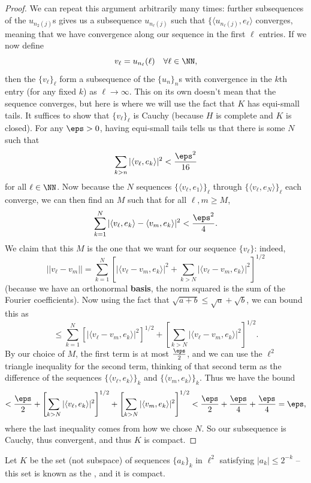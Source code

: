 \begin{proof}
We can repeat this argument arbitrarily many times: further subsequences of the $u_{n_2(j)}$s gives us a subsequence $u_{n_\ell(j)}$ such that $\{\langle u_{n_\ell(j)}, e_\ell \rangle$ converges, meaning that we have convergence along our sequence in the first $\ell$ entries. If we now define
\[
    v_\ell = u_{n_\ell}(\ell) \quad \forall \ell \in \NN,
\]  
then the $\{v_\ell\}_\ell$ form a subsequence of the $\{u_n\}_n$s with convergence in the $k$th entry (for any fixed $k$) as $\ell \to \infty$. This on its own doesn't mean that the sequence converges, but here is where we will use the fact that $K$ has equi-small tails. It suffices to show that $\{v_\ell\}_{\ell}$ is Cauchy (because $H$ is complete and $K$ is closed). For any $\eps > 0$, having equi-small tails tells us that there is some $N$ such that 
\[
    \sum_{k > n} |\langle v_\ell, e_k \rangle|^2 < \frac{\eps^2}{16}
\]
for all $\ell \in \NN$. Now because the $N$ sequences $\{\langle v_\ell, e_1 \rangle\}_\ell$ through $\{\langle v_\ell, e_N \rangle\}_\ell$ each converge, we can then find an $M$ such that for all $\ell, m \ge M$, 
\[
    \sum_{k=1}^N |\langle v_\ell, e_k \rangle - \langle v_m, e_k \rangle|^2 < \frac{\eps^2}{4}.
\]
We claim that this $M$ is the one that we want for our sequence $\{v_\ell\}$: indeed, 
\[
    ||v_\ell - v_m|| = \sum_{k=1}^N \left[|\langle v_\ell - v_m, e_k \rangle|^2 + \sum_{k>N} |\langle v_\ell - v_m, e_k \rangle|^2\right]^{1/2}
\]
(because we have an orthonormal \textbf{basis}, the norm squared is the sum of the Fourier coefficients). Now using the fact that $\sqrt{a+b} \le \sqrt{a} + \sqrt{b}$, we can bound this as 
\[
    \le \sum_{k=1}^N \left[|\langle v_\ell - v_m, e_k \rangle|^2\right]^{1/2} + \left[\sum_{k>N} |\langle v_\ell - v_m, e_k \rangle|^2\right]^{1/2}.
\]
By our choice of $M$, the first term is at most $\frac{\eps}{2}$, and we can use the $\ell^2$ triangle inequality for the second term, thinking of that second term as the difference of the sequences $\{\langle v_\ell, e_k \rangle\}_k$ and $\{\langle v_m, e_k \rangle\}_k$. Thus we have the bound
\[
    < \frac{\eps}{2} + \left[\sum_{k>N} |\langle v_\ell, e_k \rangle|^2\right]^{1/2} + \left[\sum_{k>N} |\langle v_m, e_k \rangle|^2\right]^{1/2} < \frac{\eps}{2} + \frac{\eps}{4} + \frac{\eps}{4} = \eps,
\]
where the last inequality comes from how we chose $N$. So our subsequence is Cauchy, thus convergent, and thus $K$ is compact. 
\end{proof}

\begin{example}
Let $K$ be the set (not subspace) of sequences $\{a_k\}_k$ in $\ell^2$ satisfying $|a_k| \le 2^{-k}$ -- this set is known as the , and it is compact. 
\end{example}

